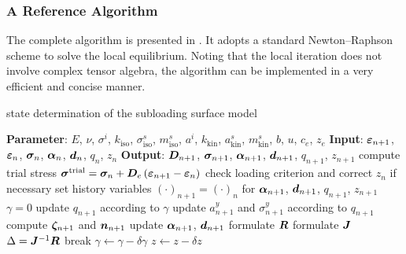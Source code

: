 \subsubsection{A Reference Algorithm}
The complete algorithm is presented in .
It adopts a standard Newton--Raphson scheme to solve the local equilibrium.
Noting that the local iteration does not involve complex tensor algebra, the algorithm can be implemented in a very efficient and concise manner.
\begin{breakablealgorithm}
    \caption{state determination of the subloading surface model}\label{algo:subloading_steel}
    \begin{algorithmic}
        \State \textbf{Parameter}: $E$, $\nu$, $\sigma^i$, $k_\text{iso}$, $\sigma^s_\text{iso}$, $m^s_\text{iso}$, $a^i$, $k_\text{kin}$, $a^s_\text{kin}$, $m^s_\text{kin}$, $b$, $u$, $c_e$, $z_e$
        \State \textbf{Input}: $\bm{\varepsilon}_{n+1}$, $\bm{\varepsilon}_n$, $\bm{\sigma}_n$, $\bm{\alpha}_{n}$, $\bm{d}_n$, $q_n$, $z_n$
        \State \textbf{Output}: $\bm{D}_{n+1}$, $\bm{\sigma}_{n+1}$, $\bm{\alpha}_{n+1}$, $\bm{d}_{n+1}$, $q_{n+1}$, $z_{n+1}$
        \State compute trial stress $\bm{\sigma}^\text{trial}=\bm{\sigma}_n+\bm{D}_e\left(\bm{\varepsilon}_{n+1}-\bm{\varepsilon}_n\right)$
        \State check loading criterion and correct $z_n$ if necessary
        \State set history variables $\left(\cdot\right)_{n+1}=\left(\cdot\right)_{n}$ for $\bm{\alpha}_{n+1}$, $\bm{d}_{n+1}$, $q_{n+1}$, $z_{n+1}$
        \State $\gamma=0$
        \State update $q_{n+1}$ according to $\gamma$
        \State update $a^y_{n+1}$ and $\sigma^y_{n+1}$ according to $q_{n+1}$
        \State compute $\bm{\zeta}_{n+1}$ and $\bm{n}_{n+1}$
        \State update $\bm{\alpha}_{n+1}$, $\bm{d}_{n+1}$
        \State formulate $\bm{R}$
        \State formulate $\bm{J}$
        \State $\Delta=\bm{J}^{-1}\bm{R}$
        \State break
        \EndIf
        \State $\gamma\leftarrow\gamma-\delta\gamma$
        \State $z\leftarrow{}z-\delta{}z$
        \EndWhile

\end{algorithmic}
\end{breakablealgorithm}
